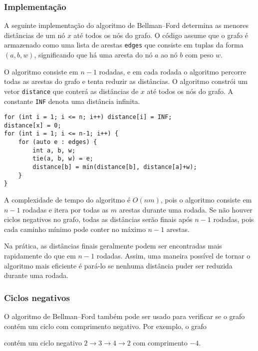 \subsubsection{Implementação}

A seguinte implementação do
algoritmo de Bellman–Ford determina as menores distâncias
de um nó $x$ até todos os nós do grafo.
O código assume que o grafo é armazenado
como uma lista de arestas \texttt{edges}
que consiste em tuplas da forma $(a,b,w)$,
significando que há uma aresta do nó $a$ ao nó $b$
com peso $w$.

O algoritmo consiste em $n-1$ rodadas,
e em cada rodada o algoritmo percorre
todas as arestas do grafo e tenta
reduzir as distâncias.
O algoritmo constrói um vetor \texttt{distance}
que conterá as distâncias de $x$
até todos os nós do grafo.
A constante \texttt{INF} denota uma distância infinita.

\begin{lstlisting}
for (int i = 1; i <= n; i++) distance[i] = INF;
distance[x] = 0;
for (int i = 1; i <= n-1; i++) {
    for (auto e : edges) {
        int a, b, w;
        tie(a, b, w) = e;
        distance[b] = min(distance[b], distance[a]+w);
    }
}
\end{lstlisting}

A complexidade de tempo do algoritmo é $O(nm)$,
pois o algoritmo consiste em $n-1$ rodadas e
itera por todas as $m$ arestas durante uma rodada.
Se não houver ciclos negativos no grafo,
todas as distâncias serão finais após $n-1$ rodadas,
pois cada caminho mínimo pode conter no máximo $n-1$ arestas.

Na prática, as distâncias finais geralmente podem
ser encontradas mais rapidamente do que em $n-1$ rodadas.
Assim, uma maneira possível de tornar o algoritmo mais eficiente
é pará-lo se nenhuma distância
puder ser reduzida durante uma rodada.

\subsubsection{Ciclos negativos}


O algoritmo de Bellman–Ford também pode ser usado para
verificar se o grafo contém um ciclo com comprimento negativo.
Por exemplo, o grafo

\begin{center}
\end{center}
\noindent
contém um ciclo negativo
$2 \rightarrow 3 \rightarrow 4 \rightarrow 2$
com comprimento $-4$.

